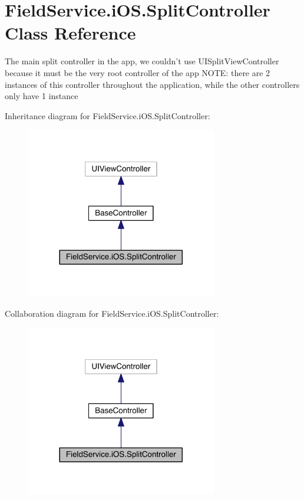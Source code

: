 \hypertarget{class_field_service_1_1i_o_s_1_1_split_controller}{\section{Field\+Service.\+i\+O\+S.\+Split\+Controller Class Reference}
\label{class_field_service_1_1i_o_s_1_1_split_controller}
}


The main split controller in the app, we couldn't use U\+I\+Split\+View\+Controller because it must be the very root controller of the app N\+O\+T\+E\+: there are 2 instances of this controller throughout the application, while the other controllers only have 1 instance  




Inheritance diagram for Field\+Service.\+i\+O\+S.\+Split\+Controller\+:
\nopagebreak
\begin{figure}[H]
\begin{center}
\leavevmode
\includegraphics[width=236pt]{class_field_service_1_1i_o_s_1_1_split_controller__inherit__graph}
\end{center}
\end{figure}


Collaboration diagram for Field\+Service.\+i\+O\+S.\+Split\+Controller\+:
\nopagebreak
\begin{figure}[H]
\begin{center}
\leavevmode
\includegraphics[width=236pt]{class_field_service_1_1i_o_s_1_1_split_controller__coll__graph}
\end{center}
\end{figure}
